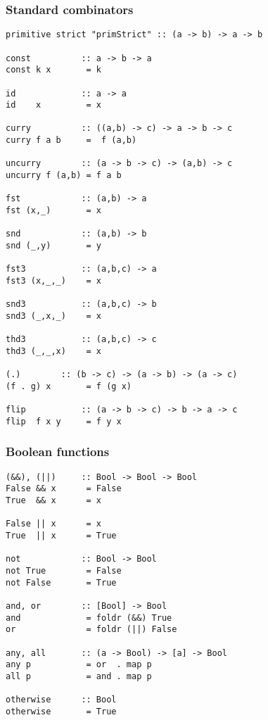 \subsubsection*{Standard combinators}
\begin{verbatim}
primitive strict "primStrict" :: (a -> b) -> a -> b

const          :: a -> b -> a
const k x       = k

id             :: a -> a
id    x         = x

curry          :: ((a,b) -> c) -> a -> b -> c
curry f a b     =  f (a,b)

uncurry        :: (a -> b -> c) -> (a,b) -> c
uncurry f (a,b) = f a b

fst            :: (a,b) -> a
fst (x,_)       = x

snd            :: (a,b) -> b
snd (_,y)       = y

fst3           :: (a,b,c) -> a
fst3 (x,_,_)    = x

snd3           :: (a,b,c) -> b
snd3 (_,x,_)    = x

thd3           :: (a,b,c) -> c
thd3 (_,_,x)    = x

(.)	       :: (b -> c) -> (a -> b) -> (a -> c)
(f . g) x       = f (g x)

flip           :: (a -> b -> c) -> b -> a -> c
flip  f x y     = f y x
\end{verbatim}
\subsubsection*{Boolean functions}
\begin{verbatim}
(&&), (||)     :: Bool -> Bool -> Bool
False && x      = False
True  && x      = x

False || x      = x
True  || x      = True

not            :: Bool -> Bool
not True        = False
not False       = True

and, or        :: [Bool] -> Bool
and             = foldr (&&) True
or              = foldr (||) False

any, all       :: (a -> Bool) -> [a] -> Bool
any p           = or  . map p
all p           = and . map p

otherwise      :: Bool
otherwise       = True
\end{verbatim}
